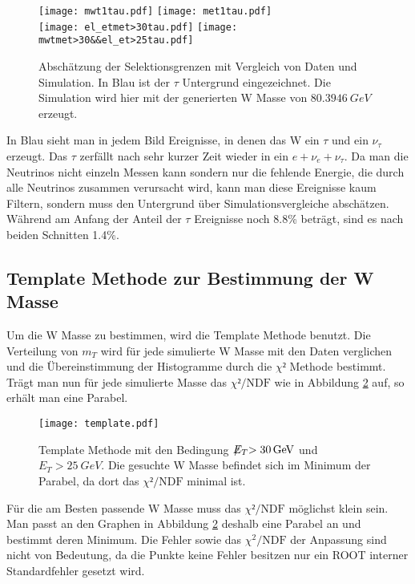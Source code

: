 \documentclass[a4paper,12pt]{article}
\newcommand{\met}{\ensuremath{\not\mathrel{E}}_T}
\begin{document}
\begin{figure}[h]
	\centering
	\texttt{[image: mwt1tau.pdf]}
	\texttt{[image: met1tau.pdf]}\\
	\texttt{[image: el\_etmet>30tau.pdf]}
	\texttt{[image: mwtmet>30\&\&el\_et>25tau.pdf]}
	\caption{Abschätzung der Selektionsgrenzen mit Vergleich von Daten und Simulation. In Blau ist
	der $τ$ Untergrund eingezeichnet. Die Simulation wird hier mit der generierten W Masse von
	$\SI{80.3946}{GeV}$ erzeugt.}
	\label{fig:abschaetzung}
\end{figure}

In Blau sieht man in jedem Bild Ereignisse, in denen das W ein $τ$ und ein $ν_τ$ erzeugt. Das $τ$
zerfällt nach sehr kurzer Zeit wieder in ein $e + ν_e + ν_τ$. Da man die Neutrinos nicht einzeln
Messen kann sondern nur die fehlende Energie, die durch alle Neutrinos zusammen verursacht wird,
kann man diese Ereignisse kaum Filtern, sondern muss den Untergrund über Simulationsvergleiche
abschätzen. Während am Anfang der Anteil der $τ$ Ereignisse noch 8.8\% beträgt, sind es nach beiden
Schnitten 1.4\%.

\subsection{Template Methode zur Bestimmung der W Masse}
Um die W Masse zu bestimmen, wird die Template Methode benutzt.
Die Verteilung von $m_T$ wird für jede simulierte W Masse mit den Daten verglichen und die
Übereinstimmung der Histogramme durch die $χ²$ Methode bestimmt. Trägt man nun für jede simulierte
Masse das $χ²/\text{NDF}$ wie in Abbildung \ref{fig:template} auf, so erhält man eine Parabel.

\begin{figure}[htb]
	\centering
	\texttt{[image: template.pdf]}
	\caption{Template Methode mit den Bedingung $\met > \SI{30}{GeV}$ und $E_{T} > \SI{25}{GeV}$. Die gesuchte W Masse befindet sich im Minimum der Parabel, da dort
		das $χ²/\text{NDF}$ minimal ist.}
	\label{fig:template}
\end{figure}

Für die am Besten passende W Masse muss das $χ²/\text{NDF}$ möglichst klein sein. Man passt an den
Graphen in Abbildung \ref{fig:template} deshalb eine Parabel an und bestimmt deren Minimum. Die
Fehler sowie das $χ^2/\text{NDF}$ der Anpassung sind nicht von Bedeutung, da die Punkte keine
Fehler besitzen nur ein ROOT interner Standardfehler gesetzt wird.
\end{document}
